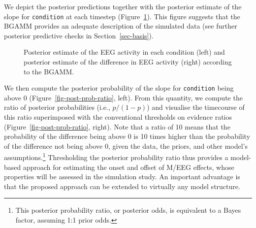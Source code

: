 \documentclass[
  doc,
  floatsintext,
  longtable,
  a4paper,
  nolmodern,
  notxfonts,
  notimes,
  donotrepeattitle,
  colorlinks=true,linkcolor=blue,citecolor=blue,urlcolor=blue]{apa7}
\begin{document}
We depict the posterior predictions together with the posterior estimate
of the slope for \texttt{condition} at each timestep
(Figure~\ref{fig-plot-post-slope}). This figure suggests that the BGAMM
provides an adequate description of the simulated data (see further
posterior predictive checks in Section~\ref{sec-basis}).

\begin{figure}[!htb]

\caption{\label{fig-plot-post-slope}Posterior estimate of the EEG
activity in each condition (left) and posterior estimate of the
difference in EEG activity (right) according to the BGAMM.}


\end{figure}%

We then compute the posterior probability of the slope for
\texttt{condition} being above \(0\) (Figure~\ref{fig-post-prob-ratio},
left). From this quantity, we compute the ratio of posterior
probabilities (i.e., \(p/(1-p)\)) and visualise the timecourse of this
ratio superimposed with the conventional thresholds on evidence ratios
(Figure~\ref{fig-post-prob-ratio}, right). Note that a ratio of 10 means
that the probability of the difference being above 0 is 10 times higher
than the probability of the difference not being above 0, given the
data, the priors, and other model's assumptions.\footnote{This posterior
  probability ratio, or posterior odds, is equivalent to a Bayes factor,
  assuming 1:1 prior odds.} Thresholding the posterior probability ratio
thus provides a model-based approach for estimating the onset and offset
of M/EEG effects, whose properties will be assessed in the simulation
study. An important advantage is that the proposed approach can be
extended to virtually any model structure.
\end{document}
